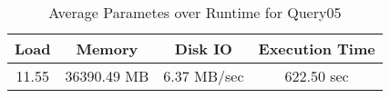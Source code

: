 \documentclass[../../main.tex]{subfiles}
\begin{document}
    \begin{table}
        \begin{center}
            \begin{tabular}{ |c|c|c|c| } 
            \hline
            Load & Memory & Disk IO & Execution Time\\
            \hline
            11.55 & 36390.49 MB & 6.37 MB/sec & 622.50 sec \\
            \hline
            \end{tabular}
            \\[1pt]
            \caption{Average Parametes over Runtime for Query05}
        \end{center}
    \end{table}
    \pagebreak
\end{document}
